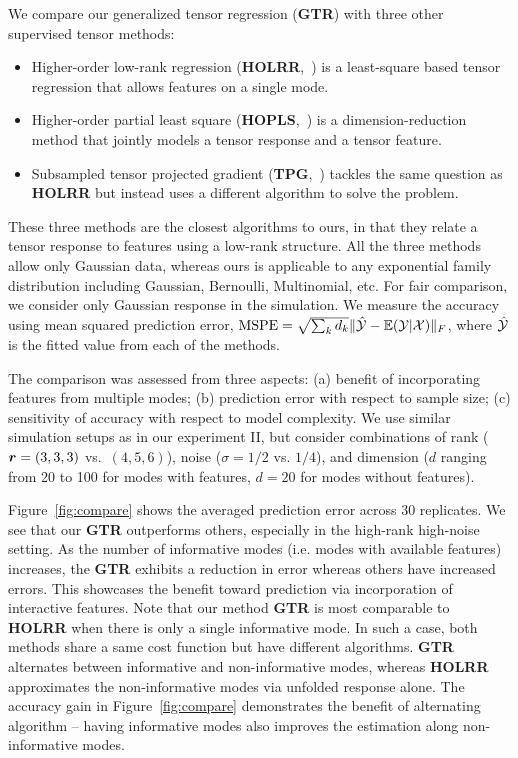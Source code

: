 \documentclass[12pt]{article}
\theoremstyle{plain}
\theoremstyle{definition}
\begin{document}
We compare our generalized tensor regression ({\bf GTR}) with three other supervised tensor methods:
\begin{itemize}
\item  Higher-order low-rank regression ({\bf HOLRR},~\citep{rabusseau2016low}) is a least-square based tensor regression that allows features on a single mode. 
\item Higher-order partial least square ({\bf HOPLS},~\citep{zhao2012higher}) is a dimension-reduction method that jointly models a tensor response and a tensor feature. 
\item Subsampled tensor projected gradient ({\bf TPG},~\citep{yu2016learning}) tackles the same question as {\bf HOLRR} but instead uses a different algorithm to solve the problem. 
\end{itemize}
These three methods are the closest algorithms to ours, in that they relate a tensor response to features using a low-rank structure. All the three methods allow only Gaussian data, whereas ours is applicable to any exponential family distribution including Gaussian, Bernoulli, Multinomial, etc. For fair comparison, we consider only Gaussian response in the simulation. We measure the accuracy using mean squared prediction error, $\text{MSPE}=\sqrt{\sum_kd_k}\lVert\hat {\mathcal{Y}}-\mathbb{E}(\mathcal{Y}|\mathcal{X})\rVert_F$, where $\hat {\mathcal{Y}}$ is the fitted value from each of the methods. 

The comparison was assessed from three aspects: (a) benefit of incorporating features from multiple modes; (b) prediction error with respect to sample size; (c) sensitivity of accuracy with respect to model complexity. We use similar simulation setups as in our experiment II, but consider combinations of rank ($\bm{r}=(3,3,3)$ vs.\ $(4,5,6)$), noise ($\sigma = 1/2$ vs. $1/4$), and dimension ($d$ ranging from 20 to 100 for modes with features, $d = 20$ for modes without features). 

Figure~\ref{fig:compare} shows the averaged prediction error across 30 replicates. We see that our {\bf GTR} outperforms others, especially in the high-rank high-noise setting. As the number of informative modes (i.e. modes with available features) increases, the {\bf GTR} exhibits a reduction in error whereas others have increased errors. This showcases the benefit toward prediction via incorporation of interactive features. Note that our method {\bf GTR} is most comparable to {\bf HOLRR} when there is only a single informative mode. In such a case, both methods share a same cost function but have different algorithms. {\bf GTR} alternates between informative and non-informative modes, whereas {\bf HOLRR} approximates the non-informative modes via unfolded response alone. The accuracy gain in Figure~\ref{fig:compare} demonstrates the benefit of alternating algorithm -- having informative modes also improves the estimation along non-informative modes. 
\end{document}

